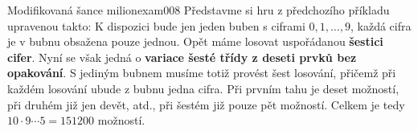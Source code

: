 \begin{mathexam}{Modifikovaná šance milion}{exam008}
  Představme si hru z předchozího příkladu upravenou takto: K dispozici bude jen jeden buben s
  ciframi \(0, 1, \ldots, 9\), každá cifra je v bubnu obsažena pouze jednou. Opět máme losovat
  uspořádanou \textbf{šestici cifer}. Nyní se však jedná o \textbf{variace šesté třídy z deseti
  prvků bez opakování}. S jediným bubnem musíme totiž provést šest losování, přičemž při každém
  losování ubude z bubnu jedna cifra. Při prvním tahu je deset možností, při druhém již jen devět,
  atd., při šestém již pouze pět možností. Celkem je tedy \(10 \cdot 9 \cdots 5 = \num{151200}\)
  možností.
\end{mathexam}